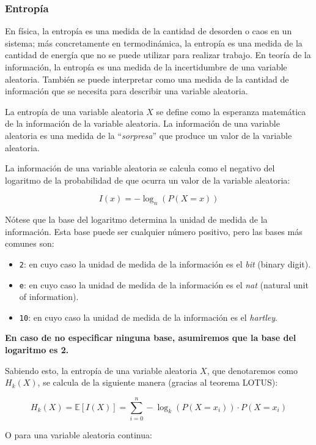 \subsubsection{Entropía}\label{entropuxeda-1}

En física, la entropía es una medida de la cantidad de desorden o caos
en un sistema; más concretamente en termodinámica, la entropía es una
medida de la cantidad de energía que no se puede utilizar para realizar
trabajo. En teoría de la información, la entropía es una medida de la
incertidumbre de una variable aleatoria. También se puede interpretar
como una medida de la cantidad de información que se necesita para
describir una variable aleatoria.

La entropía de una variable aleatoria \(X\) se define como la esperanza
matemática de la información de la variable aleatoria. La información de
una variable aleatoria es una medida de la ``\emph{sorpresa}'' que
produce un valor de la variable aleatoria.

La información de una variable aleatoria se calcula como el negativo del
logaritmo de la probabilidad de que ocurra un valor de la variable
aleatoria:

\[
I(x) = -\log_n\left(P(X=x)\right)
\]

Nótese que la base del logaritmo determina la unidad de medida de la
información. Esta base puede ser cualquier número positivo, pero las
bases más comunes son:

\begin{itemize}
\tightlist
\item
  \texttt{2}: en cuyo caso la unidad de medida de la información es el
  \emph{bit} (binary digit).
\item
  \texttt{e}: en cuyo caso la unidad de medida de la información es el
  \emph{nat} (natural unit of information).
\item
  \texttt{10}: en cuyo caso la unidad de medida de la información es el
  \emph{hartley}.
\end{itemize}

\textbf{En caso de no especificar ninguna base, asumiremos que la base
del logaritmo es 2.}

Sabiendo esto, la entropía de una variable aleatoria \(X\), que
denotaremos como \(H_k(X)\), se calcula de la siguiente manera (gracias
al teorema LOTUS):

\[
H_k(X) = \mathbb{E}[I(X)] = \sum_{i=0}^n -\log_k\left(P(X=x_i)\right) \cdot P(X=x_i)
\]

O para una variable aleatoria continua:

